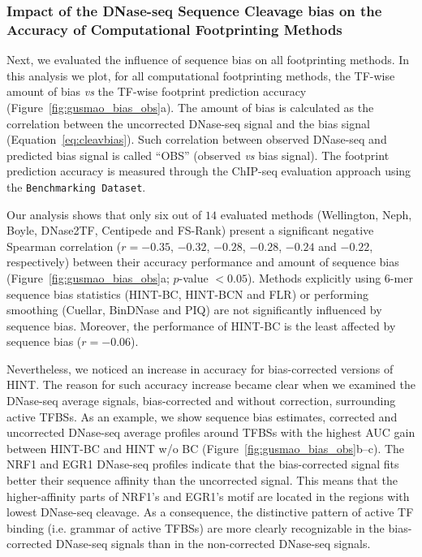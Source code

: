 \subsubsection{Impact of the DNase-seq Sequence Cleavage bias on the Accuracy of Computational Footprinting Methods}

Next, we evaluated the influence of sequence bias on all footprinting methods. In this analysis we plot, for all computational footprinting methods, the TF-wise amount of bias \emph{vs} the TF-wise footprint prediction accuracy (Figure~\ref{fig:gusmao_bias_obs}a). The amount of bias is calculated as the correlation between the uncorrected DNase-seq signal and the bias signal (Equation~\ref{eq:cleavbias}). Such correlation between observed DNase-seq and predicted bias signal is called ``OBS'' (observed \emph{vs} bias signal). The footprint prediction accuracy is measured through the ChIP-seq evaluation approach using the {\tt Benchmarking Dataset}.

Our analysis shows that only six out of $14$ evaluated methods (Wellington, Neph, Boyle, DNase2TF, Centipede and FS-Rank) present a significant negative Spearman correlation ($r = -0.35$, $-0.32$, $-0.28$, $-0.28$, $-0.24$ and $-0.22$, respectively) between their accuracy performance and amount of sequence bias (Figure~\ref{fig:gusmao_bias_obs}a; $p$-value $< 0.05$). Methods explicitly using $6$-mer sequence bias statistics (HINT-BC, HINT-BCN and FLR) or performing smoothing (Cuellar, BinDNase and PIQ) are not significantly influenced by sequence bias. Moreover, the performance of HINT-BC is the least affected by sequence bias ($r = -0.06$).

Nevertheless, we noticed an increase in accuracy for bias-corrected versions of HINT. The reason for such accuracy increase became clear when we examined the DNase-seq average signals, bias-corrected and without correction, surrounding active TFBSs. As an example, we show sequence bias estimates, corrected and uncorrected DNase-seq average profiles around TFBSs with the highest AUC gain between HINT-BC and HINT w/o BC (Figure~\ref{fig:gusmao_bias_obs}b--c). The NRF1 and EGR1 DNase-seq profiles indicate that the bias-corrected signal fits better their sequence affinity than the uncorrected signal. This means that the higher-affinity parts of NRF1's and EGR1's motif are located in the regions with lowest DNase-seq cleavage. As a consequence, the distinctive pattern of active TF binding (i.e. grammar of active TFBSs) are more clearly recognizable in the bias-corrected DNase-seq signals than in the non-corrected DNase-seq signals.

